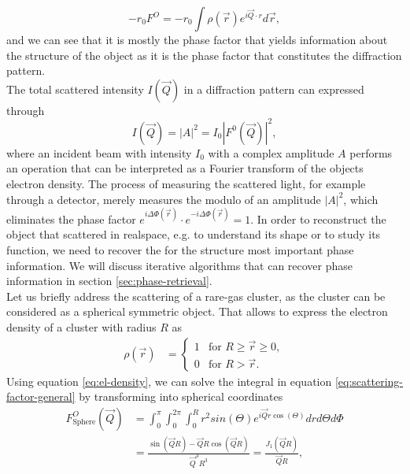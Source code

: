 \begin{equation}
-r_{0}F^{O}=-r_{0}\int \rho\left(\vec{r}\right) e^{i \vec{Q}\cdot r}d\vec{r},
\label{eq:scattering-factor-general}
\end{equation}
and we can see that it is mostly the phase factor that yields information about the structure of the object as it is the phase factor that constitutes the diffraction pattern.\\
The total scattered intensity $I\left(\vec{Q}\right)$ in a diffraction pattern can expressed through
\begin{equation}
I\left(\vec{Q}\right)=\left|A\right|^{2}=I_{0}\left|F^{0}\left(\vec{Q}\right)\right|^{2},
\label{eq:scattered-intensity}
\end{equation}
where an incident beam with intensity $I_{0}$ with a complex amplitude $A$ performs an operation that can be interpreted as a Fourier transform of the objects electron density. The process of measuring the scattered light, for example through a detector, merely measures the modulo of an amplitude $\left|A\right|^{2}$, which eliminates the phase factor $e^{i\Delta\Phi\left(\vec{r}\right)}\cdot e^{-i\Delta\Phi\left(\vec{r}\right)}=1$. In order to reconstruct the object that scattered in realspace, e.g. to understand its shape or to study its function, we need to recover the for the structure most important phase information. We will discuss iterative algorithms that can recover phase information in section \ref{sec:phase-retrieval}.\\
Let us briefly address the scattering of a rare-gas cluster, as the cluster can be considered as a spherical symmetric object. That allows to express the electron density of a cluster with radius $R$ as 
\begin{align}
\rho\left(\vec{r}\right)&=\begin{cases}
1& \text{for $R \geq \vec{r} \geq 0$},\\
0&\text{for $R > \vec{r}$}.
\end{cases}
\label{eq:el-density}
\end{align}
Using equation \eqref{eq:el-density}, we can solve the integral in equation \eqref{eq:scattering-factor-general} by transforming into spherical coordinates
\begin{align}
F_{\text{Sphere}}^{O}\left(\vec{Q}\right) &= \int_{0}^{\pi}\int_{0}^{2\pi}\int_{0}^{R} r^{2}  sin\left(\Theta\right) e^{i \vec{Q} r \cos\left(\Theta\right)} dr d\Theta d\Phi\\
&=\frac{\sin\left(\vec{Q} R\right)-\vec{Q} R\cos\left(\vec{Q} R\right)}{\vec{Q}^{3} R^{3}}=\frac{J_{1}\left(\vec{Q}R\right)}{\vec{Q}R},
\label{eq:scattering from sphere}
\end{align}
